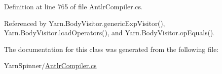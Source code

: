 Definition at line 765 of file Antlr\-Compiler.\-cs.



Referenced by Yarn.\-Body\-Visitor.\-generic\-Exp\-Visitor(), Yarn.\-Body\-Visitor.\-load\-Operators(), and Yarn.\-Body\-Visitor.\-op\-Equals().



The documentation for this class was generated from the following file\-:\begin{DoxyCompactItemize}
\item 
Yarn\-Spinner/\hyperlink{a00294}{Antlr\-Compiler.\-cs}\end{DoxyCompactItemize}
